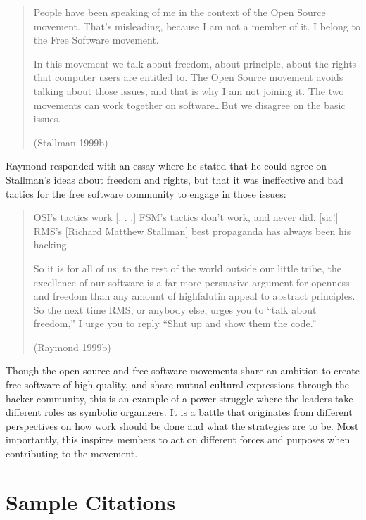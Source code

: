 \documentclass{mitpress}
\begin{document}

\begin{quotation}
People have been speaking of me in the context of the Open Source movement.
That's misleading, because I am not a member of it. I belong to the Free
Software movement. 

In this movement we talk about freedom, about principle, about the rights
that computer users are entitled to. The Open Source movement avoids talking
about those issues, and that is why I am not joining it. The two movements
can work together on software\ldots But we disagree on the basic issues. 

\noindent
(Stallman 1999b)
\end{quotation}

Raymond responded with an essay where he stated that he could agree
on Stallman's ideas about freedom and rights, but that it was ineffective
and bad tactics for the free software community to engage in those issues:

\begin{quotation}
OSI's tactics work [. . .] FSM's tactics don't work, and never did. [sic!]
RMS's [Richard
Matthew Stallman] best propaganda has always been his hacking. 

So it is for all of us; to the rest of the world outside our little tribe,
the excellence of our software is a far more persuasive argument for openness
and freedom than any amount of highfalutin appeal to abstract principles. So
the next time RMS, or anybody else, urges you to ``talk about freedom,''
I urge you to reply ``Shut up and show them the code.''

\noindent
(Raymond 1999b)
\end{quotation}

Though the open source and free software movements share an ambition
to create free software of high quality, and share mutual cultural
expressions through the hacker community, this is an example of a power
struggle where the leaders take different roles as symbolic organizers. It is
a battle that originates from different perspectives on how work should be
done and what the strategies are to be. Most importantly, this inspires
members to act on different forces and purposes when contributing to the
movement.


\chapter{Sample Citations}
\end{document}
